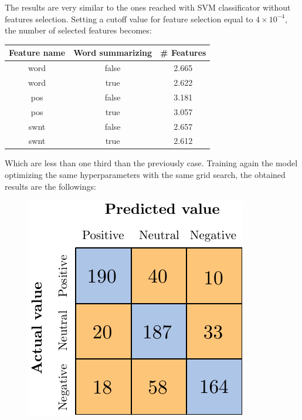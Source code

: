 
The results are very similar to the ones reached with SVM classificator without features selection. Setting a cutoff value for feature selection equal to $4\times10^{-4}$, the number of selected features becomes:

\begin{center}
	\begin{tabular}{ c  c  c } 
		\hline
		\textbf{Feature name} & \textbf{Word summarizing} & \textbf{\# Features} \\
		\hline
		word & false & 2.665 \\ 
		\hline
		word & true & 2.622 \\ 
		\hline
		pos & false & 3.181 \\ 
		\hline
		pos & true & 3.057 \\ 
		\hline
		swnt & false & 2.657 \\ 
		\hline
		swnt & true & 2.612 \\ 
		\hline
	\end{tabular}
\end{center}


Which are less than one third than the previously case. Training again the model optimizing the same hyperparameters with the same grid search, the obtained results are the followings:

\begin{figure}[H]
	\centering
	\includegraphics[scale=1]{figures/conf_matrices/twitter_snt_bpef/twitter_snt_bpef_afs.pdf}
	\label{fig:tw_snt_bpef_afs}
\end{figure}

